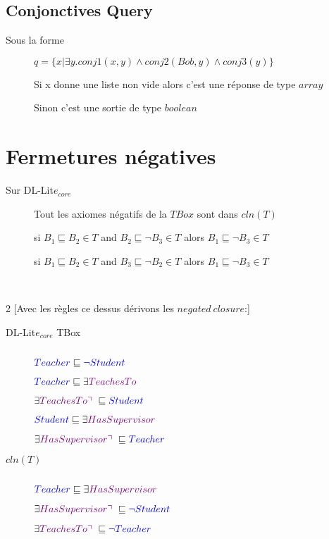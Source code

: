 \subsection{Conjonctives Query}
\begin{description}
\item[Sous la forme] $q = \{x | \exists y.conj1(x,y) \wedge conj2(Bob, y) \wedge conj3(y)\}$
\item[] Si x donne une liste non vide alors c'est une réponse de type $array$
\item[] Sinon c'est une sortie de type $boolean$
\end{description}

\section{Fermetures négatives}
\begin{description}
\item[Sur DL-Lit$e_{core}$] Tout les axiomes négatifs de la $TBox$ sont dans $cln(T)$
\item[] si $B_1 \sqsubseteq B_2 \in T$ and $B_2 \sqsubseteq \neg B_3 \in T$ alors $B_1 \sqsubseteq \neg B_3 \in T$
\item[] si $B_1 \sqsubseteq B_2 \in T$ and $B_3 \sqsubseteq \neg B_2 \in T$ alors $B_1 \sqsubseteq \neg B_3 \in T$
\end{description}
\ \\
\begin{multicols}{2}
[Avec les règles ce dessus dérivons les $negated\ closure$:]
\begin{description}
\item[DL-Lit$e_{core}$ TBox] $ $
\item[] $\textcolor{blue}{Teacher} \sqsubseteq \textcolor{blue}{\neg Student}$
\item[] $\textcolor{blue}{Teacher} \sqsubseteq \exists \textcolor{violet}{TeachesTo}$
\item[] $\exists \textcolor{violet}{TeachesTo \urcorner\  } \sqsubseteq \textcolor{blue}{Student}$
\item[] $\textcolor{blue}{Student} \sqsubseteq \exists \textcolor{violet}{HasSupervisor}$
\item[] $\exists \textcolor{violet}{HasSupervisor \urcorner\ } \sqsubseteq \textcolor{blue}{Teacher}$
\end{description}

\begin{description}
\item[$cln(T)$] $ $
\item[] $\textcolor{blue}{Teacher} \sqsubseteq \exists \textcolor{violet}{HasSupervisor}$
\item[] $\exists \textcolor{violet}{HasSupervisor \urcorner\ } \sqsubseteq \textcolor{blue}{\neg Student}$
\item[] $\exists \textcolor{violet}{TeachesTo \urcorner\  } \sqsubseteq \textcolor{blue}{\neg Teacher}$
\item[] $ $
\item[] $ $
\end{description}

\end{multicols}
\pagebreak
